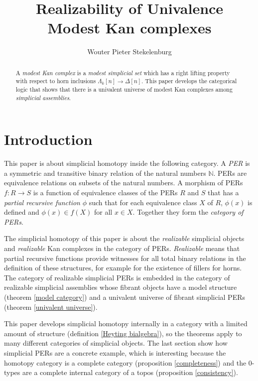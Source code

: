 \documentclass{tac}
\title{Realizability of Univalence\\Modest Kan complexes}
\author{Wouter Pieter Stekelenburg}\copyrightyear{2015}
\newcommand\N{\mathbb N}
\newcommand\of{:}
\newcommand\simplex\Delta
\newcommand\horn\Lambda
\begin{document}
\begin{abstract}
A \emph{modest Kan complex} is a \emph{modest simplicial set} which has a right lifting property with respect to horn inclusions $\horn_k[n] \to \simplex[n]$. This paper develops the categorical logic that shows that there is a univalent universe of modest Kan complexes among \emph{simplicial assemblies}.
\end{abstract}

\maketitle


\section{Introduction}
This paper is about simplicial homotopy inside the following category. A \emph{PER} is a symmetric and transitive binary relation of the natural numbers $\N$. PERs are equivalence relations on subsets of the natural numbers. A morphism of PERs $f\of R\to S$ is a function of equivalence classes of the PERs $R$ and $S$ that has a \emph{partial recursive function} $\phi$ such that for each equivalence class $X$ of $R$, $\phi(x)$ is defined and $\phi(x)\in f(X)$ for all $x\in X$. Together they form the \emph{category of PERs}. 

The simplicial homotopy of this paper is about the \emph{realizable} simplicial objects and \emph{realizable} Kan complexes in the category of PERs. \emph{Realizable} means that partial recursive functions provide witnesses for all total binary relations in the definition of these structures, for example for the existence of fillers for horns. The category of realizable simplicial PERs is embedded in the category of realizable simplicial assemblies whose fibrant objects have a model structure (theorem \ref{model category}) and a univalent universe of fibrant simplicial PERs (theorem \ref{univalent universe}).

This paper develops simplicial homotopy internally in a category with a limited amount of structure (definition \ref{Heyting bialgebra}), so the theorems apply to many different categories of simplicial objects. The last section show how simplicial PERs are a concrete example, which is interesting because the homotopy category is a complete category (proposition \ref{completeness}) and the 0-types are a complete internal category of a topos (proposition \ref{consistency}).
\end{document}
